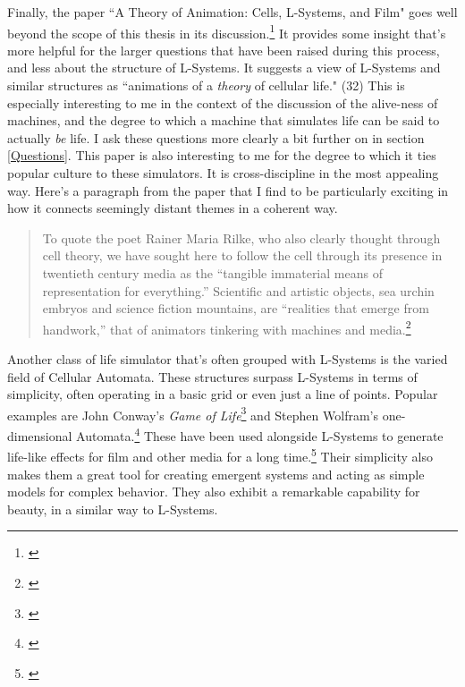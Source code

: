 \documentclass[12pt,twoside]{reedthesis}
\begin{document}
	Finally, the paper ``A Theory of Animation: Cells, L-Systems, and Film" goes well beyond the scope of this thesis in its discussion.\footnote{\cite{theory2004}} It provides some insight that's more helpful for the larger questions that have been raised during this process, and less about the structure of L-Systems. It suggests a view of L-Systems and similar structures as ``animations of a \textit{theory} of cellular life." (32) This is especially interesting to me in the context of the discussion of the alive-ness of machines, and the degree to which a machine that simulates life can be said to actually \textit{be} life. I ask these questions more clearly a bit further on in section \ref{Questions}. This paper is also interesting to me for the degree to which it ties popular culture to these simulators. It is cross-discipline in the most appealing way. Here's a paragraph from the paper that I find to be particularly exciting in how it connects seemingly distant themes in a coherent way.
	
	\begin{quote}
	To quote the poet Rainer Maria Rilke, who also clearly thought through cell theory, we have sought here to follow the cell through its presence in twentieth century media as the “tangible immaterial means of representation for everything.” Scientific and artistic objects, sea urchin embryos and science fiction mountains, are “realities that emerge from handwork,” that of animators tinkering with machines and media.\footnote{\cite{theory2004}}
	\end{quote}
	
	
	Another class of life simulator that's often grouped with L-Systems is the varied field of Cellular Automata. These structures surpass L-Systems in terms of simplicity, often operating in a basic grid or even just a line of points. Popular examples are John Conway's \textit{Game of Life}\footnote{\cite{GameOfLife1970}} and Stephen Wolfram's one-dimensional Automata.\footnote{\cite{wolfram2002}} These have been used alongside L-Systems to generate life-like effects for film and other media for a long time.\footnote{\cite{theory2004}} Their simplicity also makes them a great tool for creating emergent systems and acting as simple models for complex behavior. They also exhibit a remarkable capability for beauty, in a similar way to L-Systems.
	
\end{document}
